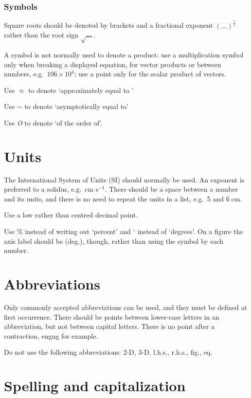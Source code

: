\documentclass{jfm}
\begin{document}
\subsubsection{Symbols}

Square roots should be denoted by brackets and a fractional exponent
$(...)^{\frac{1}{2}}$ rather than the root sign $\sqrt{...}$.

A symbol is not normally used to denote a product: use a multiplication
symbol only when breaking a displayed equation, for vector products or
between numbers, e.g.\ $106 \times 10^{4}$; use a point only for the scalar
product of vectors.

Use $\approx$ to denote `approximately equal to '

Use $\sim$ to denote `asymptotically equal to'

Use \textit{O} to denote `of the order of'.

\section{Units}

The International System of Units (SI) should normally be used.
An exponent is preferred to a solidus, e.g.\ cm s$^{-1}$. There should be
a space between a number and its units, and there is no need to repeat the
units in a list, e.g.\ 5 and 6$\;$cm.

Use a low rather than centred decimal point.

Use \% instead of writing out `percent' and $^{\circ}$  instead of `degrees'.
On a figure the axis label should be (deg.), though, rather than using the
symbol by each number.

\section{Abbreviations}

Only commonly accepted abbreviations can be used, and they must be
defined at first occurrence. There should be points between lower-case
letters in an abbreviation, but not between capital letters. There is no
point after a contraction, engng for example.

Do not use the following abbreviations: 2-D, 3-D, l.h.s., r.h.s., fig., eq.

\section{Spelling and capitalization}
\end{document}
